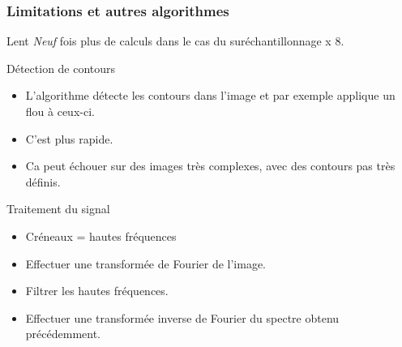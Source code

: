 \begin{frame}
\frametitle{Limitations et autres algorithmes}

\begin{alertblock}{Lent}
\emph{Neuf} fois plus de calculs dans le cas du suréchantillonnage x 8.
\end{alertblock}

{
	\begin{block}{Détection de contours}
	\begin{itemize}
	\item L'algorithme détecte les contours dans l'image et par exemple applique un flou à ceux-ci.
	\item C'est plus rapide.
	\item Ca peut échouer sur des images très complexes, avec des contours pas très définis.
	\end{itemize}
	\end{block}
}

{
	\begin{block}{Traitement du signal}
	\begin{itemize}
	\item Créneaux = hautes fréquences
	\item Effectuer une transformée de Fourier de l'image.
	\item Filtrer les hautes fréquences.
	\item Effectuer une transformée inverse de Fourier du spectre obtenu précédemment.
	\end{itemize}
	\end{block}
}

\end{frame}

